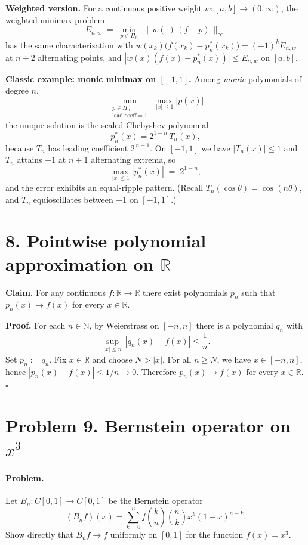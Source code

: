 \documentclass[12pt,a4paper]{article}
\newcommand{\qed}{\hfill$\square$}
\theoremstyle{plain}
\theoremstyle{definition}
\theoremstyle{remark}
\theoremstyle{remark}
\begin{document}
\medskip
\noindent\textbf{Weighted version.}
For a continuous positive weight $w:[a,b]\to(0,\infty)$, the weighted minimax problem
\[
E_{n,w} \;=\; \min_{p\in\Pi_n}\ \|\,w(\cdot)\,(f-p)\,\|_\infty
\]
has the same characterization with $w(x_k)\bigl(f(x_k)-p_n^{*}(x_k)\bigr)=(-1)^k E_{n,w}$ at $n+2$ alternating points, and $|w(x)(f(x)-p_n^{*}(x))|\le E_{n,w}$ on $[a,b]$.

\medskip
\noindent\textbf{Classic example: monic minimax on $[-1,1]$.}
Among \emph{monic} polynomials of degree $n$,
\[
\min_{\substack{p\in\Pi_n\\ \text{lead coeff}=1}}\ \max_{|x|\le 1}|p(x)|
\]
the unique solution is the scaled Chebyshev polynomial
\[
p_n^{*}(x)=2^{1-n}\,T_n(x),
\]
because $T_n$ has leading coefficient $2^{\,n-1}$. On $[-1,1]$ we have $|T_n(x)|\le 1$ and $T_n$ attains $\pm 1$ at $n+1$ alternating extrema, so
\[
\max_{|x|\le 1}|p_n^{*}(x)| \;=\; 2^{1-n},
\]
and the error exhibits an equal-ripple pattern. (Recall $T_n(\cos\theta)=\cos(n\theta)$, and $T_n$ equioscillates between $\pm1$ on $[-1,1]$.)

\section*{8. Pointwise polynomial approximation on $\mathbb{R}$}
\textbf{Claim.} For any continuous $f:\mathbb{R}\to\mathbb{R}$ there exist polynomials $p_n$ such that $p_n(x)\to f(x)$ for every $x\in\mathbb{R}$.

\textbf{Proof.} For each $n\in\mathbb{N}$, by Weierstrass on $[-n,n]$ there is a polynomial $q_n$ with
\[
\sup_{|x|\le n}\,|q_n(x)-f(x)|\le \frac{1}{n}.
\]
Set $p_n:=q_n$. Fix $x\in\mathbb{R}$ and choose $N>|x|$. For all $n\ge N$, we have $x\in[-n,n]$, hence
$|p_n(x)-f(x)|\le 1/n\to 0$. Therefore $p_n(x)\to f(x)$ for every $x\in\mathbb{R}$. \qed

\section*{Problem 9. Bernstein operator on $x^3$}

\paragraph{Problem.}
Let $B_n:C[0,1]\to C[0,1]$ be the Bernstein operator
\[
(B_n f)(x)=\sum_{k=0}^{n} f\!\left(\frac{k}{n}\right)\binom{n}{k}x^{k}(1-x)^{n-k}.
\]
Show directly that $B_n f\to f$ uniformly on $[0,1]$ for the function $f(x)=x^3$.
\end{document}
